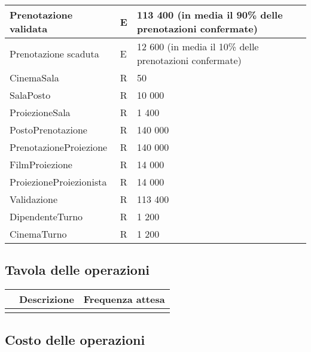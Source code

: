 \begin{tabularx}{\linewidth}{|X|l|X|}
    \\ \hline
    Prenotazione validata
     & E
     & 113 400 (in media il 90\% delle prenotazioni confermate)
    \\ \hline
    Prenotazione scaduta
     & E
     & 12 600 (in media il 10\% delle prenotazioni confermate)
    \\ \hline
    CinemaSala
     & R
     & 50
    \\ \hline
    SalaPosto
     & R
     & 10 000
    \\ \hline
    ProiezioneSala
     & R
     & 1 400
    \\ \hline
    PostoPrenotazione
     & R
     & 140 000
    \\ \hline
    PrenotazioneProiezione
     & R
     & 140 000
    \\ \hline
    FilmProiezione
     & R
     & 14 000
    \\ \hline
    ProiezioneProiezionista
     & R
     & 14 000
    \\ \hline
    Validazione
     & R
     & 113 400
    \\ \hline
    DipendenteTurno
     & R
     & 1 200
    \\ \hline
    CinemaTurno
     & R
     & 1 200
    \\ \hline
\end{tabularx}

\subsection*{Tavola delle operazioni}
%
%
\begin{tabularx}{\linewidth}{|l|X|X|}
    \hline
    \rowcolor{tblhdrcolor}
    \multicolumn{1}{|c|}{\textbf{Cod.}}
     & \multicolumn{1}{|c|}{\textbf{Descrizione}}
     & \multicolumn{1}{|c|}{\textbf{Frequenza attesa}}
    \\\hline
    \hfill
     & \hfill
     & \hfill
    \\ \hline
\end{tabularx}

\subsection*{Costo delle operazioni}
%
%
